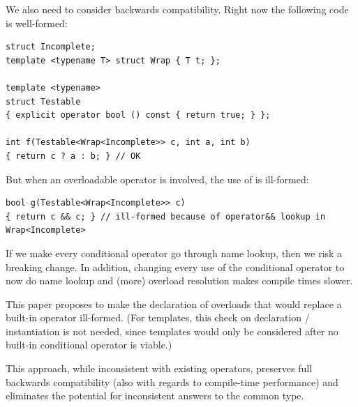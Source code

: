 We also need to consider backwards compatibility.
Right now the following code is well-formed:
\medskip\begin{lstlisting}
struct Incomplete;
template <typename T> struct Wrap { T t; };

template <typename>
struct Testable
{ explicit operator bool () const { return true; } };

int f(Testable<Wrap<Incomplete>> c, int a, int b)
{ return c ? a : b; } // OK
\end{lstlisting}

But when an overloadable operator is involved, the use of  is ill-formed:
\medskip\begin{lstlisting}
bool g(Testable<Wrap<Incomplete>> c)
{ return c && c; } // ill-formed because of operator&& lookup in Wrap<Incomplete>
\end{lstlisting}

If we make every conditional operator go through name lookup, then we risk a breaking change.
In addition, changing every use of the conditional operator to now do name lookup and (more) overload resolution makes compile times slower.

This paper proposes to make the declaration of  overloads that would replace a built-in operator ill-formed.
(For  templates, this check on declaration / instantiation is not needed, since templates would only be considered after no built-in conditional operator is viable.)

This approach, while inconsistent with existing operators, preserves full backwards compatibility (also with regards to compile-time performance) and eliminates the potential for inconsistent answers to the common type.


